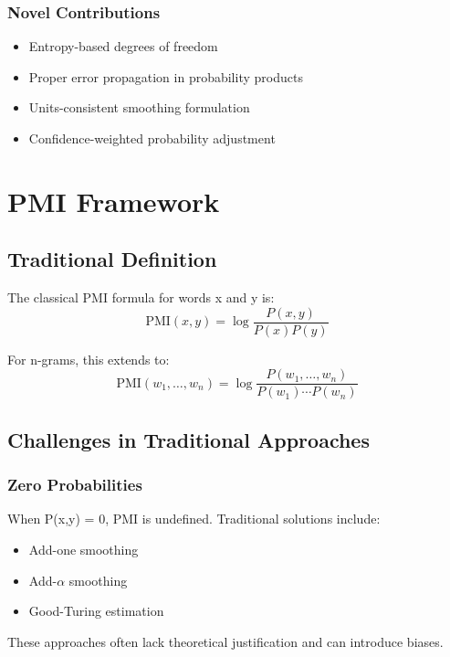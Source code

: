 \documentclass[12pt,a4paper]{article}
\begin{document}
\subsubsection{Novel Contributions}
\begin{itemize}
    \item Entropy-based degrees of freedom
    \item Proper error propagation in probability products
    \item Units-consistent smoothing formulation
    \item Confidence-weighted probability adjustment
\end{itemize}

\section{PMI Framework}

\subsection{Traditional Definition}
The classical PMI formula for words x and y is:
\begin{equation}
    \text{PMI}(x,y) = \log\frac{P(x,y)}{P(x)P(y)}
\end{equation}

For n-grams, this extends to:
\begin{equation}
    \text{PMI}(w_1,\ldots,w_n) = \log\frac{P(w_1,\ldots,w_n)}{P(w_1)\cdots P(w_n)}
\end{equation}

\subsection{Challenges in Traditional Approaches}
\subsubsection{Zero Probabilities}
When P(x,y) = 0, PMI is undefined. Traditional solutions include:
\begin{itemize}
    \item Add-one smoothing
    \item Add-$\alpha$ smoothing
    \item Good-Turing estimation
\end{itemize}

These approaches often lack theoretical justification and can introduce biases.
\end{document}
